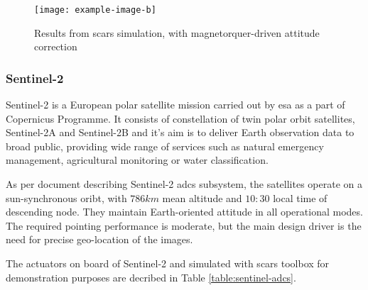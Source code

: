         \begin{figure}[H]
            \centering
            \texttt{[image: example-image-b]}
            \caption{Results from \ac{scars} simulation, with magnetorquer-driven attitude correction}
            \label{fig:scars-deorbit}
        \end{figure}




    \subsubsection{Sentinel-2} 
    
    Sentinel-2 is a European polar satellite mission carried out by \ac{esa} as a part of Copernicus Programme. It consists of constellation of twin polar orbit satellites, Sentinel-2A and Sentinel-2B and it's aim is to deliver Earth observation data to broad public, providing wide range of services such as natural emergency management, agricultural monitoring or water classification. \cite{sentinelreference_description}

    As per document describing Sentinel-2 \ac{adcs} subsystem, the satellites operate on a sun-synchronous oribt, with $786km$ mean altitude and $10:30$ local time of descending node. They maintain Earth-oriented attitude in all operational modes. The required pointing performance is moderate, but the main design driver is the need for precise geo-location of the images. \cite{sentinelreference_adcs}

    The actuators on board of Sentinel-2 and simulated with \ac{scars} toolbox for demonstration purposes are decribed in Table \ref{table:sentinel-adcs}.

        
